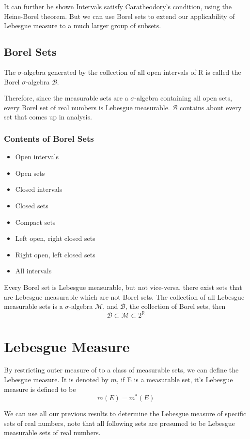 \documentclass{article}
\begin{document}
It can further be shown Intervals satisfy Caratheodory's condition, using the Heine-Borel theorem. But we can use Borel sets to extend our applicability of Lebesgue measure to a much larger group of subsets.

\subsection{Borel Sets}
The $\sigma$-algebra generated by the collection of all open intervals of R is called the Borel $\sigma$-algebra $\mathscr{B}$.

Therefore, since the measurable sets are a $\sigma$-algebra containing all open sets, every Borel set of real numbers is Lebesgue measurable. $\mathscr{B}$ contains about every set that comes up in analysis.

\subsubsection{Contents of Borel Sets}
\begin{itemize}
    \item Open intervals
    \item Open sets
    \item Closed intervals
    \item Closed sets
    \item Compact sets
    \item Left open, right closed sets
    \item Right open, left closed sets
    \item All intervals
\end{itemize}

Every Borel set is Lebesgue measurable, but not vice-versa, there exist sets that are Lebesgue measurable which are not Borel sets.
The collection of all Lebesgue measurable sets is a $\sigma$-algebra $\mathscr{M}$, and $\mathscr{B}$, the collection of Borel sets, then
$$\mathscr{B} \subset \mathscr{M} \subset 2^{\mathbb{R}} $$
\newpage
\section{Lebesgue Measure}

By restricting outer measure of to a class of measurable sets, we can define the Lebesgue measure. It is denoted by $m$, if E is a measurable set, it's Lebesgue measure is defined to be
$$m(E)=m^*(E)$$

We can use all our previous results to determine the Lebesgue measure of specific sets of real numbers, note that all following sets are presumed to be Lebesgue measurable sets of real numbers.
\end{document}
